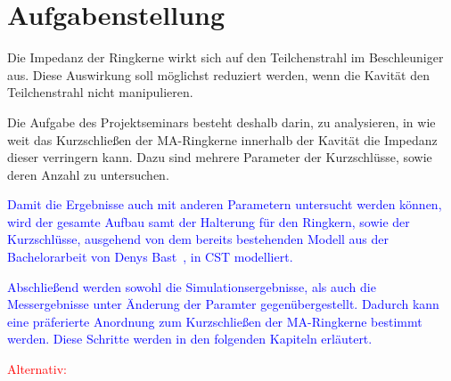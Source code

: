 \section{Aufgabenstellung}
Die Impedanz der Ringkerne wirkt sich auf den Teilchenstrahl im Beschleuniger aus. Diese Auswirkung soll möglichst reduziert werden, wenn die Kavität den Teilchenstrahl nicht manipulieren.
\par
Die Aufgabe des Projektseminars besteht deshalb darin, zu analysieren, in wie weit das Kurzschlie\ss{}en der MA-Ringkerne innerhalb der Kavit\"at die Impedanz dieser verringern kann. Dazu sind mehrere Parameter der Kurzschl\"usse, sowie deren Anzahl zu untersuchen.
\par
\textcolor{blue}{
Damit die Ergebnisse auch mit anderen Parametern untersucht werden k\"onnen, wird der gesamte Aufbau samt der Halterung f\"ur den Ringkern, sowie der Kurzschl\"usse, ausgehend von dem bereits bestehenden Modell aus der Bachelorarbeit von Denys Bast~\citep{bast2017ba}, in CST modelliert.}
\par
\textcolor{blue}{
Abschlie\ss{}end werden sowohl die Simulationsergebnisse, als auch die Messergebnisse unter \"Anderung der Paramter gegen\"ubergestellt. Dadurch kann eine pr\"aferierte Anordnung zum Kurzschlie\ss{}en der MA-Ringkerne bestimmt werden. Diese Schritte werden in den folgenden Kapiteln erl\"autert.}
\par 
\textcolor{red}{Alternativ:}

